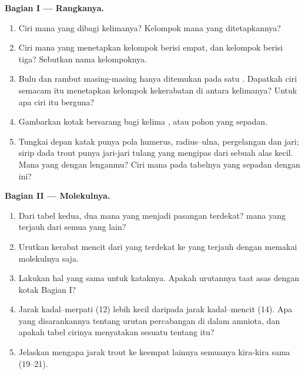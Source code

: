 \begin{problem}
\medskip
\noindent\textbf{Bagian I --- Rangkanya.}
\begin{enumerate}
  \item Ciri mana yang dibagi kelimanya? Kelompok mana yang
        ditetapkannya?
  \item Ciri mana yang menetapkan kelompok berisi empat, dan kelompok
        berisi tiga? Sebutkan nama kelompoknya.
  \item Bulu dan rambut masing-masing hanya ditemukan pada satu
        . Dapatkah ciri semacam itu menetapkan kelompok
        kekerabatan di antara kelimanya? Untuk apa ciri itu berguna?
  \item Gambarkan kotak bersarang bagi kelima , atau pohon
        yang sepadan.
  \item Tungkai depan katak punya pola humerus, radius--ulna,
        pergelangan dan jari; sirip dada trout punya jari-jari tulang
        yang mengipas dari sebuah alas kecil. Mana yang  dengan
        lenganmu? Ciri mana pada tabelnya yang sepadan dengan ini?
\end{enumerate}

\medskip
\noindent\textbf{Bagian II --- Molekulnya.}
\begin{enumerate}[resume]
  \item Dari tabel kedua, dua  mana yang menjadi pasangan
        terdekat?  mana yang terjauh dari semua yang lain?
  \item Urutkan kerabat mencit dari yang terdekat ke yang terjauh
        dengan memakai molekulnya saja.
  \item Lakukan hal yang sama untuk kataknya. Apakah urutannya taat
        asas dengan kotak Bagian I?
  \item Jarak kadal--merpati (12) lebih kecil daripada jarak
        kadal--mencit (14). Apa yang disarankannya tentang urutan
        percabangan di dalam amniota, dan apakah tabel cirinya
        menyatakan sesuatu tentang itu?
  \item Jelaskan mengapa jarak trout ke keempat lainnya semuanya
        kira-kira sama (19--21).
\end{enumerate}


\end{problem}
